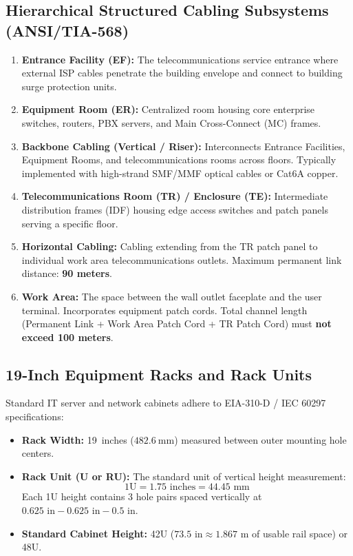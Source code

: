\subsection{Hierarchical Structured Cabling Subsystems (ANSI/TIA-568)}
\begin{enumerate}[leftmargin=*]
    \item \textbf{Entrance Facility (EF):} The telecommunications service entrance where external ISP cables penetrate the building envelope and connect to building surge protection units.
    \item \textbf{Equipment Room (ER):} Centralized room housing core enterprise switches, routers, PBX servers, and Main Cross-Connect (MC) frames.
    \item \textbf{Backbone Cabling (Vertical / Riser):} Interconnects Entrance Facilities, Equipment Rooms, and telecommunications rooms across floors. Typically implemented with high-strand SMF/MMF optical cables or Cat6A copper.
    \item \textbf{Telecommunications Room (TR) / Enclosure (TE):} Intermediate distribution frames (IDF) housing edge access switches and patch panels serving a specific floor.
    \item \textbf{Horizontal Cabling:} Cabling extending from the TR patch panel to individual work area telecommunications outlets. Maximum permanent link distance: \textbf{90 meters}.
    \item \textbf{Work Area:} The space between the wall outlet faceplate and the user terminal. Incorporates equipment patch cords. Total channel length (Permanent Link + Work Area Patch Cord + TR Patch Cord) must \textbf{not exceed 100 meters}.
\end{enumerate}

\subsection{19-Inch Equipment Racks and Rack Units}
Standard IT server and network cabinets adhere to EIA-310-D / IEC 60297 specifications:
\begin{itemize}[leftmargin=*]
    \item \textbf{Rack Width:} 19~inches ($482.6~\text{mm}$) measured between outer mounting hole centers.
    \item \textbf{Rack Unit (U or RU):} The standard unit of vertical height measurement:
    \[
    1\text{U} = 1.75\text{ inches} = 44.45\text{ mm}
    \]
    Each 1U height contains 3 hole pairs spaced vertically at $0.625\text{ in} - 0.625\text{ in} - 0.5\text{ in}$.
    \item \textbf{Standard Cabinet Height:} 42U ($73.5\text{ in} \approx 1.867\text{ m}$ of usable rail space) or 48U.
\end{itemize}


